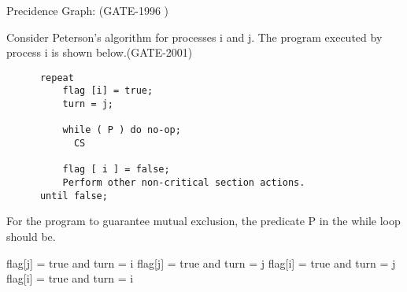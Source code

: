 
\begin{questyle}

  \question Precidence Graph: (GATE-1996 )
  \end{questyle}




\begin{questyle}

  \question  Consider Peterson’s algorithm for processes i and j. The program executed by process i is shown below.(GATE-2001)

  \begin{lstlisting}
      repeat
          flag [i] = true;
          turn = j;

          while ( P ) do no-op;
            CS

          flag [ i ] = false;
          Perform other non-critical section actions.
      until false;
  \end{lstlisting}
  For the program to guarantee mutual exclusion, the predicate P in the while loop should be.
  \begin{choices}
    \choice flag[j] = true and turn = i
    \CorrectChoice flag[j] = true and turn = j
    \choice flag[i] = true and turn = j
    \choice flag[i] = true and turn = i
  \end{choices}

  \end{questyle}




